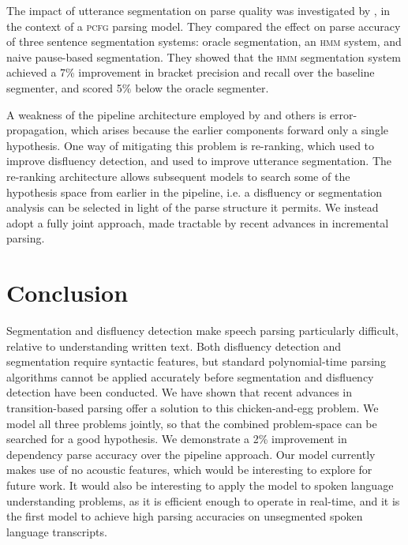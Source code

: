 \documentclass[11pt,letterpaper]{article}
\begin{document}
The impact of utterance segmentation on parse quality was investigated by
\citet{kahn:04}, in the context of a \textsc{pcfg} parsing model.  They compared
the effect on parse accuracy of three sentence segmentation systems: oracle segmentation,
an \textsc{hmm} system, and naive pause-based segmentation.  They showed that
the \textsc{hmm} segmentation system achieved a 7\% improvement in bracket
precision and recall over the baseline segmenter, and scored 5\% below the
oracle segmenter.

A weakness of the pipeline architecture employed by \citet{kahn:04} and others
is error-propagation, which arises because the earlier components forward only
a single hypothesis.  One way of mitigating this problem is re-ranking, which
\citet{Johnson04a,Johnson04b} used to improve disfluency detection, and
\citet{roark:06} used to improve utterance segmentation.  The re-ranking architecture
allows subsequent models to search some of the hypothesis space from earlier in the
pipeline, i.e. a disfluency or segmentation analysis can be selected in light
of the parse structure it permits.  We instead adopt a fully joint approach,
made tractable by recent advances in incremental parsing.

\section{Conclusion}

Segmentation and disfluency detection make speech parsing particularly
difficult, relative to understanding written text.  Both disfluency detection
and segmentation require syntactic features, but standard polynomial-time
parsing algorithms cannot be applied accurately before segmentation and disfluency
detection have been conducted.
We have shown that recent advances in transition-based parsing offer a solution
to this chicken-and-egg problem.  We model all three problems
jointly, so that the combined problem-space can be searched for a good
hypothesis. 
We demonstrate a 2\% improvement in dependency parse accuracy over the pipeline
approach.  Our model currently makes use of no acoustic features, which would be interesting
to explore for future work.  It would also be interesting to apply the model to
spoken language understanding problems, as it is efficient enough to operate
in real-time, and it is the first model to achieve high
parsing accuracies on unsegmented spoken language transcripts.



\end{document}
